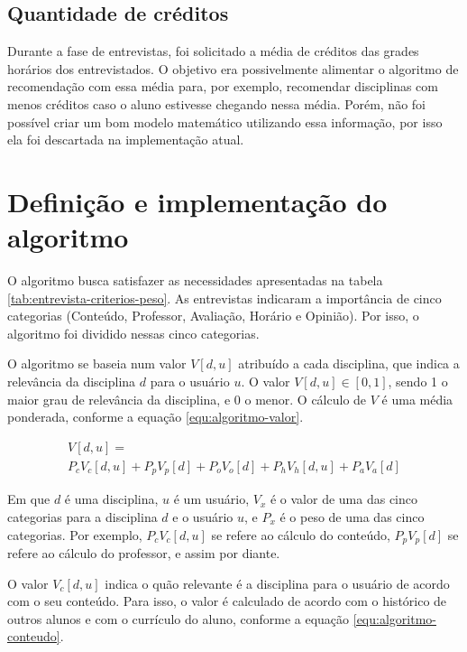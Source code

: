 \subsection{Quantidade de créditos}
Durante a fase de entrevistas, foi solicitado a média de créditos das grades horários dos entrevistados. O objetivo era possivelmente alimentar o algoritmo de recomendação com essa média para, por exemplo, recomendar disciplinas com menos créditos caso o aluno estivesse chegando nessa média. Porém, não foi possível criar um bom modelo matemático utilizando essa informação, por isso ela foi descartada na implementação atual.


\section{Definição e implementação do algoritmo}
\label{sec:Definição e implementação do algoritmo}

O algoritmo busca satisfazer as necessidades apresentadas na tabela \ref{tab:entrevista-criterios-peso}. As entrevistas indicaram a importância de cinco categorias (Conteúdo, Professor, Avaliação, Horário e Opinião). Por isso, o algoritmo foi dividido nessas cinco categorias.

O algoritmo se baseia num valor $V[d,u]$ atribuído a cada disciplina, que indica a relevância da disciplina $d$ para o usuário $u$. O valor $V[d,u] \in [0, 1]$,
sendo 1 o maior grau de relevância da disciplina, e 0 o menor. O cálculo de $V$ é uma média ponderada, conforme a equação \ref{equ:algoritmo-valor}.

\begin{multline}
\label{equ:algoritmo-valor}
    V[d,u] = \\
        P_cV_c[d,u] + P_pV_p[d] + P_oV_o[d] + P_hV_h[d,u] + P_aV_a[d]
\end{multline}

Em que $d$ é uma disciplina, $u$ é um usuário, $V_x$ é o valor de uma das cinco categorias para a disciplina $d$ e o usuário $u$, e $P_x$ é o peso de uma das cinco categorias. Por exemplo, $P_cV_c[d,u]$ se refere ao cálculo do conteúdo, $P_pV_p[d]$ se refere ao cálculo do professor, e assim por diante.


O valor $V_c[d,u]$ indica o quão relevante é a disciplina para o usuário de acordo com o seu conteúdo. Para isso, o valor é calculado de acordo com o histórico de outros alunos e com o currículo do aluno, conforme a equação \ref{equ:algoritmo-conteudo}.

